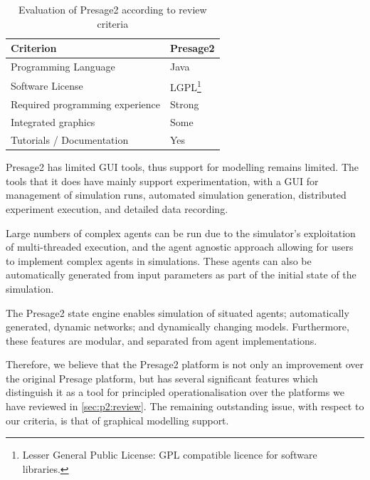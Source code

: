 \begin{table}[h]
\begin{minipage}{1\textwidth}
	\myfloatalign
	\caption{Evaluation of Presage2 according to review criteria}\label{tab:presagereview}
	\begin{tabularx}{\textwidth}{X|X}
	Criterion & Presage2 \\ \midrule
	Programming Language & Java \\
	Software License & LGPL\footnote{Lesser General Public License: \ac{GPL}
	compatible licence for software libraries.} \\
	Required programming experience & Strong \\
	Integrated graphics & Some \\
	Tutorials / Documentation & Yes \\
	\end{tabularx}
\end{minipage}
\end{table}

Presage2 has limited \ac{GUI} tools, thus support for modelling remains limited.
The tools that it does have mainly support experimentation, with a \ac{GUI} for
management of simulation runs, automated simulation generation, distributed
experiment execution, and detailed data recording.

Large numbers of complex agents can be run due to the simulator's exploitation
of multi-threaded execution, and the agent agnostic approach allowing for users
to implement complex agents in simulations. These agents can also be
automatically generated from input parameters as part of the initial state of
the simulation.

The Presage2 state engine enables simulation of situated agents;
automatically generated, dynamic networks; and dynamically changing models.
Furthermore, these features are modular, and separated from agent
implementations.

Therefore, we believe that the Presage2 platform is not only an improvement over
the original Presage platform, but has several significant features which
distinguish it as a tool for principled operationalisation over the platforms we
have reviewed in \autoref{sec:p2:review}. The remaining outstanding issue, with
respect to our criteria, is that of graphical modelling support.

